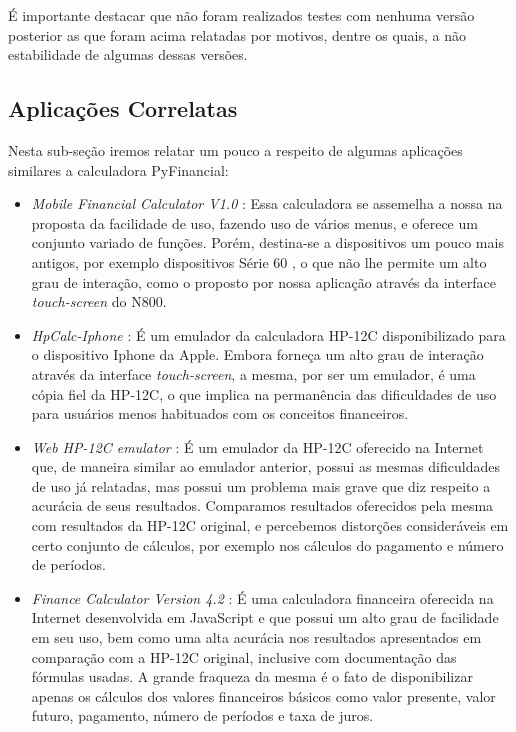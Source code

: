 É importante destacar que não foram realizados testes com nenhuma versão posterior as que foram acima relatadas por motivos, dentre os quais, a não estabilidade de algumas dessas versões.


\subsection{Aplicações Correlatas}


Nesta sub-seção iremos relatar um pouco a respeito de algumas aplicações similares a calculadora PyFinancial:

\begin{itemize}

 \item \textit{Mobile Financial Calculator V1.0} \cite{mobcalc}: Essa calculadora se assemelha a nossa na proposta da facilidade de uso, fazendo uso de vários menus, e oferece um conjunto variado de funções. Porém, destina-se a dispositivos um pouco mais antigos, por exemplo dispositivos Série 60 \cite{s60}, o que não lhe permite um alto grau de interação, como o proposto por nossa aplicação através da interface \textit{touch-screen} do N800.

 \item \textit{HpCalc-Iphone} \cite{hpiphone}: É um emulador da calculadora HP-12C disponibilizado para o dispositivo Iphone da Apple. Embora forneça um alto grau de interação através da interface \textit{touch-screen}, a mesma, por ser um emulador, é uma cópia fiel da HP-12C, o que implica na permanência das dificuldades de uso para usuários menos habituados com os conceitos financeiros.

 \item \textit{Web HP-12C emulator} \cite{epxcalc}: É um emulador da HP-12C oferecido na Internet que, de maneira similar ao emulador anterior, possui as mesmas dificuldades de uso já relatadas, mas possui um problema mais grave que diz respeito a acurácia de seus resultados. Comparamos resultados oferecidos pela mesma com resultados da HP-12C original, e percebemos distorções consideráveis em certo conjunto de cálculos, por exemplo nos cálculos do pagamento e número de períodos.

 \item \textit{Finance Calculator Version 4.2} \cite{arachnoid}: É uma calculadora financeira oferecida na Internet desenvolvida em JavaScript e que possui um alto grau de facilidade em seu uso, bem como uma alta acurácia nos resultados apresentados em comparação com a HP-12C original, inclusive com documentação das fórmulas usadas. A grande fraqueza da mesma é o fato de disponibilizar apenas os cálculos dos valores financeiros básicos como valor presente, valor futuro, pagamento, número de períodos e taxa de juros.

\end{itemize}

